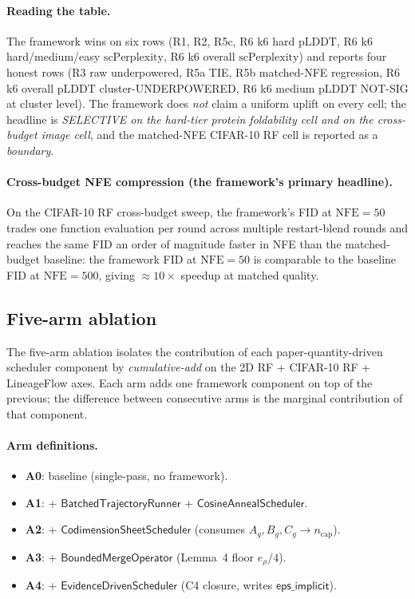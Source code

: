 \documentclass[journal,twocolumn,final]{IEEEtran}
\newcommand{\NFE}{\mathrm{NFE}}
\newcommand{\egap}{e_\rho}
\newcommand{\sheetA}{A_g}
\newcommand{\sheetB}{B_g}
\newcommand{\sheetC}{C_g}
\newcommand{\pLDDT}{\mathrm{pLDDT}}
\newcommand{\scPerp}{\mathrm{scPerplexity}}
\begin{document}
\paragraph{Reading the table.}
The framework wins on six rows (R1, R2, R5c, R6 k6 hard $\pLDDT$, R6 k6
hard/medium/easy $\scPerp$, R6 k6 overall $\scPerp$) and reports four honest
rows (R3 raw underpowered, R5a TIE, R5b matched-NFE regression, R6 k6 overall
$\pLDDT$ cluster-UNDERPOWERED, R6 k6 medium $\pLDDT$ NOT-SIG at cluster
level). The framework does \emph{not} claim a uniform uplift on every cell;
the headline is \emph{SELECTIVE on the hard-tier protein foldability cell and
on the cross-budget image cell}, and the matched-NFE CIFAR-10 RF cell is
reported as a \emph{boundary}.

\paragraph{Cross-budget NFE compression (the framework's primary headline).}
On the CIFAR-10 RF cross-budget sweep, the framework's FID at $\NFE = 50$
trades one function evaluation per round across multiple restart-blend rounds
and reaches the same FID an order of magnitude faster in NFE than the
matched-budget baseline: the framework FID at $\NFE = 50$ is comparable to the
baseline FID at $\NFE = 500$, giving $\approx 10\times$ speedup at matched
quality.

\subsection{Five-arm ablation}

The five-arm ablation isolates the contribution of each paper-quantity-driven
scheduler component by \emph{cumulative-add} on the 2D RF + CIFAR-10 RF +
LineageFlow axes. Each arm adds one framework component on top of the
previous; the difference between consecutive arms is the marginal contribution
of that component.

\paragraph{Arm definitions.}
\begin{itemize}
\item \textbf{A0}: baseline (single-pass, no framework).
\item \textbf{A1}: + $\mathsf{BatchedTrajectoryRunner}$ + $\mathsf{CosineAnnealScheduler}$.
\item \textbf{A2}: + $\mathsf{CodimensionSheetScheduler}$ (consumes $\sheetA,
\sheetB, \sheetC \to n_\mathrm{cap}$).
\item \textbf{A3}: + $\mathsf{BoundedMergeOperator}$ (Lemma~4 floor $\egap/4$).
\item \textbf{A4}: + $\mathsf{EvidenceDrivenScheduler}$ (C4 closure, writes
$\mathsf{eps\_implicit}$).
\end{itemize}
\end{document}
